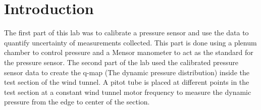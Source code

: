 \chapter{Introduction}
\label{cp:introduction}
The first part of this lab was to calibrate a pressure sensor and use the data to quantify uncertainty of measurements collected. This part is done using a plenum chamber to control pressure and a Mensor manometer to act as the standard for the pressure sensor. The second part of the lab used the calibrated pressure sensor data to create the q-map (The dynamic pressure distribution) inside the test section of the wind tunnel. A pitot tube is placed at different points in the test section at a constant wind tunnel motor frequency to measure the dynamic pressure from the edge to center of the section.